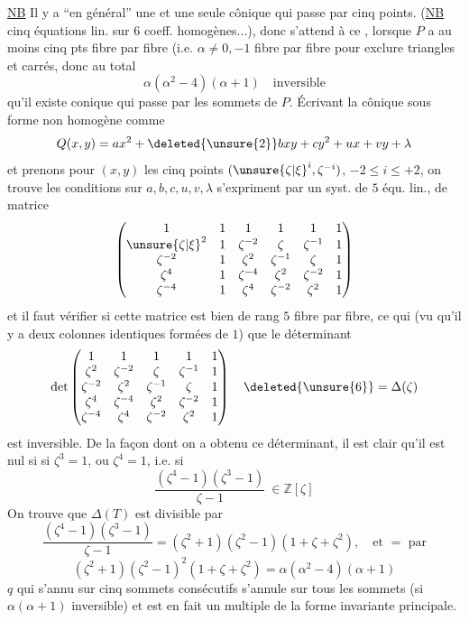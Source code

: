 \uline{NB} Il y a ``en général'' une et une seule cônique qui passe par cinq points. (\uline{NB} cinq équations lin.  sur $6$ coeff. homogènes...), donc  s'attend à ce , lorsque $P$ a au moins cinq pts fibre par fibre (i.e. $\alpha\ne0,-1$ fibre par fibre pour exclure triangles et carrés, donc au total
\[
\alpha(\alpha^2-4)(\alpha+1)\quad\text{inversible}
\]
qu'il existe \deleted{\unsure{$\exists$}} conique qui passe par les sommets de $P$. Écrivant la cônique sous forme non homogène comme
\[
Q(x,y)=ax^2+\deleted{\unsure{2}}bxy+cy^2+ux+vy+\lambda
\]
et prenons pour $(x,y)$ les cinq points $({\unsure{\zeta|\xi}}^i,\zeta^{-i})$, $-2\leq i\leq+2$, on trouve
les conditions sur $a,b,c,u,v,\lambda$ s'expriment par un syst. de $5$ équ. lin., de matrice
\[
\begin{pmatrix}
1&1&1&1&1&1\\
{\unsure{\zeta|\xi}}^2&1&\zeta^{-2}&\zeta&\zeta^{-1}&1\\
\zeta^{-2}&1&\zeta^2&\zeta^{-1}&\zeta&1\\
\zeta^4&1&\zeta^{-4}&\zeta^2&\zeta^{-2}&1\\
\zeta^{-4}&1&\zeta^4&\zeta^{-2}&\zeta^2&1
\end{pmatrix}
\]
et il faut vérifier si  cette matrice  est bien de rang $5$ fibre par fibre, ce qui  (vu qu'il y a deux colonnes identiques formées de $1$) que le déterminant 
\[
\det\begin{pmatrix}
1&1&1&1&1\\
\zeta^2&\zeta^{-2}&\zeta&\zeta^{-1}&1\\
\zeta^{-2}&\zeta^2&\zeta^{-1}&\zeta&1\\
\zeta^4&\zeta^{-4}&\zeta^2&\zeta^{-2}&1\\
\zeta^{-4}&\zeta^4&\zeta^{-2}&\zeta^2&1
\end{pmatrix}\quad\deleted{\unsure{6}}=\Delta(\zeta)
\]
est inversible. De la façon dont on a obtenu ce déterminant, il  est clair qu'il est nul si  si $\zeta^3=1$, ou $\zeta^4=1$, i.e. si 
\[
\frac{(\zeta^4-1)(\zeta^3-1)}{\zeta-1}\ \in\mathbb Z[\zeta]
\]
On trouve que $\Delta(T)$ est divisible par
\[
\frac{(\zeta^4-1)(\zeta^3-1)}{\zeta-1}
=(\zeta^2+1)(\zeta^2-1)(1+\zeta+\zeta^2),\quad\text{et }=\text{ par}
\]
\[
(\zeta^2+1)(\zeta^2-1)^2(1+\zeta+\zeta^2)=\alpha(\alpha^2-4)(\alpha+1)
\]
  $q$ qui s'annu sur cinq sommets consécutifs s'annule sur tous les sommets (si $\alpha(\alpha+1)$ inversible) et est en fait un multiple de la forme  invariante principale.

